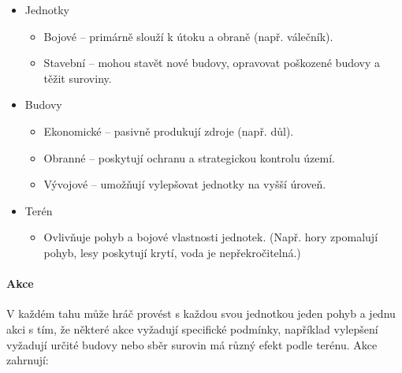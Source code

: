 \begin{itemize}
    \item Jednotky
    \begin{itemize}
        \item Bojové -- primárně slouží k útoku a obraně (např. válečník).
        \item Stavební -- mohou stavět nové budovy, opravovat poškozené budovy a těžit suroviny.
    \end{itemize}
    
    \item Budovy
    \begin{itemize}
        \item Ekonomické -- pasivně produkují zdroje (např. důl).
        \item Obranné -- poskytují ochranu a strategickou kontrolu území.
        \item Vývojové -- umožňují vylepšovat jednotky na vyšší úroveň.
    \end{itemize}
    
    \item Terén
    \begin{itemize}
        \item Ovlivňuje pohyb a bojové vlastnosti jednotek. (Např. hory zpomalují pohyb, lesy poskytují krytí, voda je nepřekročitelná.)
    \end{itemize}
    
\end{itemize}

\paragraph{Akce} V každém tahu může hráč provést s každou svou jednotkou jeden pohyb a jednu akci s tím, že některé akce vyžadují specifické podmínky, například vylepšení vyžadují určité budovy nebo sběr surovin má různý efekt podle terénu. Akce zahrnují:

